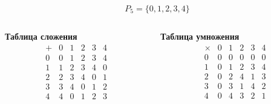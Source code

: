 \begin{frame}
    \[ P_5 = \{ 0, 1, 2, 3, 4 \} \]
    \begin{columns}
    \begin{column}{0.48\textwidth}
        \centering
        \textbf{Таблица сложения}
        \vspace{0.5em}
        \[
        \begin{array}{c|ccccc}
        + & 0 & 1 & 2 & 3 & 4 \\
        \hline
        0 & 0 & 1 & 2 & 3 & 4 \\
        1 & 1 & 2 & 3 & 4 & 0 \\
        2 & 2 & 3 & 4 & 0 & 1 \\
        3 & 3 & 4 & 0 & 1 & 2 \\
        4 & 4 & 0 & 1 & 2 & 3 \\
        \end{array}
        \]
    \end{column}

    \begin{column}{0.48\textwidth}
        \centering
        \textbf{Таблица умножения}
        \vspace{0.5em}
        \[
        \begin{array}{c|ccccc}
        \times & 0 & 1 & 2 & 3 & 4 \\
        \hline
        0 & 0 & 0 & 0 & 0 & 0 \\
        1 & 0 & 1 & 2 & 3 & 4 \\
        2 & 0 & 2 & 4 & 1 & 3 \\
        3 & 0 & 3 & 1 & 4 & 2 \\
        4 & 0 & 4 & 3 & 2 & 1 \\
        \end{array}
        \]
    \end{column}
\end{columns}
\end{frame}
